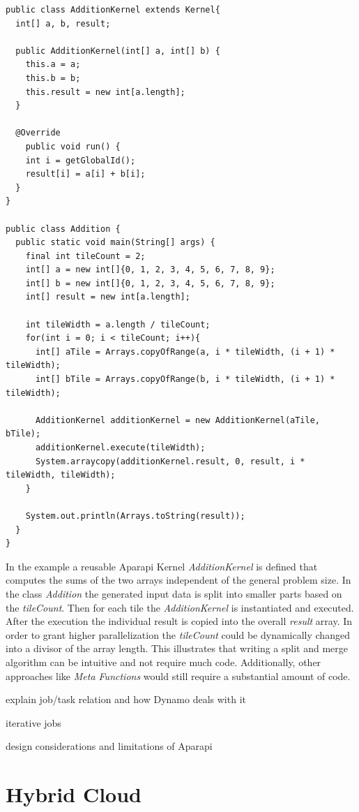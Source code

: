 \begin{lstlisting}
public class AdditionKernel extends Kernel{
  int[] a, b, result;

  public AdditionKernel(int[] a, int[] b) {
    this.a = a;
    this.b = b;
    this.result = new int[a.length];
  }

  @Override
    public void run() {
    int i = getGlobalId();
    result[i] = a[i] + b[i];
  }
}

public class Addition {
  public static void main(String[] args) {
    final int tileCount = 2;
    int[] a = new int[]{0, 1, 2, 3, 4, 5, 6, 7, 8, 9};
    int[] b = new int[]{0, 1, 2, 3, 4, 5, 6, 7, 8, 9};
    int[] result = new int[a.length];

    int tileWidth = a.length / tileCount;
    for(int i = 0; i < tileCount; i++){
      int[] aTile = Arrays.copyOfRange(a, i * tileWidth, (i + 1) * tileWidth);
      int[] bTile = Arrays.copyOfRange(b, i * tileWidth, (i + 1) * tileWidth);

      AdditionKernel additionKernel = new AdditionKernel(aTile, bTile);
      additionKernel.execute(tileWidth);
      System.arraycopy(additionKernel.result, 0, result, i * tileWidth, tileWidth);
    }

    System.out.println(Arrays.toString(result));
  }
}

\end{lstlisting}

In the example a reusable Aparapi Kernel \textit{AdditionKernel} is defined that computes the sums of the two arrays independent of the general problem size. In the class \textit{Addition} the generated input data is split into smaller parts based on the \textit{tileCount}. Then for each tile the \textit{AdditionKernel} is instantiated and executed. After the execution the individual result is copied into the overall \textit{result} array. In order to grant higher parallelization the \textit{tileCount} could be dynamically changed into a divisor of the array length. This illustrates that writing a split and merge algorithm can be intuitive and not require much code. Additionally, other approaches like \textit{Meta Functions} would still require a substantial amount of code.

explain job/task relation and how Dynamo deals with it

iterative jobs

design considerations and limitations of Aparapi

\section{Hybrid Cloud}

